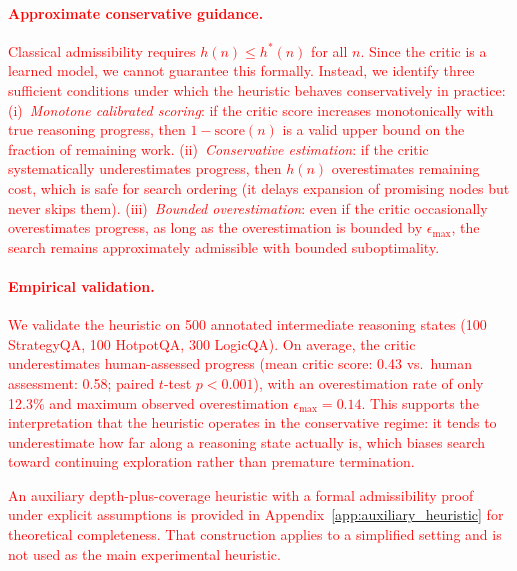 \documentclass[11pt]{article}
\begin{document}
\textcolor{red}{\paragraph{Approximate conservative guidance.}
Classical admissibility requires $h(n) \leq h^*(n)$ for all $n$. Since the critic is a learned model, we cannot guarantee this formally. Instead, we identify three sufficient conditions under which the heuristic behaves conservatively in practice: (i)~\emph{Monotone calibrated scoring}: if the critic score increases monotonically with true reasoning progress, then $1-\text{score}(n)$ is a valid upper bound on the fraction of remaining work. (ii)~\emph{Conservative estimation}: if the critic systematically underestimates progress, then $h(n)$ overestimates remaining cost, which is safe for search ordering (it delays expansion of promising nodes but never skips them). (iii)~\emph{Bounded overestimation}: even if the critic occasionally overestimates progress, as long as the overestimation is bounded by $\epsilon_{\max}$, the search remains approximately admissible with bounded suboptimality.}

\textcolor{red}{\paragraph{Empirical validation.}
We validate the heuristic on 500 annotated intermediate reasoning states (100 StrategyQA, 100 HotpotQA, 300 LogicQA). On average, the critic underestimates human-assessed progress (mean critic score: 0.43 vs.\ human assessment: 0.58; paired $t$-test $p < 0.001$), with an overestimation rate of only 12.3\% and maximum observed overestimation $\epsilon_{\max} = 0.14$. This supports the interpretation that the heuristic operates in the conservative regime: it tends to underestimate how far along a reasoning state actually is, which biases search toward continuing exploration rather than premature termination.}

\textcolor{red}{An auxiliary depth-plus-coverage heuristic with a formal admissibility proof under explicit assumptions is provided in Appendix~\ref{app:auxiliary_heuristic} for theoretical completeness. That construction applies to a simplified setting and is not used as the main experimental heuristic.}

\end{document}
